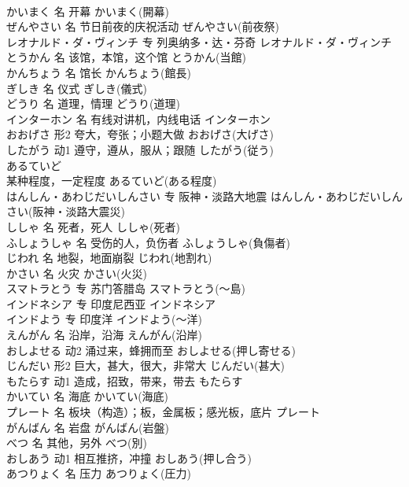 \documentclass[8pt]{extreport}
\begin{document}
\begin{CJK}{UTF8}{min}
\\	かいまく	名	开幕	かいまく(開幕)	
\\	ぜんやさい	名	节日前夜的庆祝活动	ぜんやさい(前夜祭)	
\\	レオナルド・ダ・ヴィンチ	专	列奥纳多・达・芬奇	レオナルド・ダ・ヴィンチ	
\\	とうかん	名	该馆，本馆，这个馆	とうかん(当館)	
\\	かんちょう	名	馆长	かんちょう(館長)	
\\	ぎしき	名	仪式	ぎしき(儀式)	
\\	どうり	名	道理，情理	どうり(道理)	
\\	インターホン	名	有线对讲机，内线电话	インターホン	
\\	おおげさ	形2	夸大，夸张；小题大做	おおげさ(大げさ)	
\\	したがう	动1	遵守，遵从，服从；跟随	したがう(従う)	
\\	あるていど	
\\	某种程度，一定程度	あるていど(ある程度)	
\\	はんしん・あわじだいしんさい	专	阪神・淡路大地震	はんしん・あわじだいしんさい(阪神・淡路大震災)	
\\	ししゃ	名	死者，死人	ししゃ(死者)	
\\	ふしょうしゃ	名	受伤的人，负伤者	ふしょうしゃ(負傷者)	
\\	じわれ	名	地裂，地面崩裂	じわれ(地割れ)	
\\	かさい	名	火灾	かさい(火災)	
\\	スマトラとう	专	苏门答腊岛	スマトラとう(～島)	
\\	インドネシア	专	印度尼西亚	インドネシア	
\\	インドよう	专	印度洋	インドよう(～洋)	
\\	えんがん	名	沿岸，沿海	えんがん(沿岸)	
\\	おしよせる	动2	涌过来，蜂拥而至	おしよせる(押し寄せる)	
\\	じんだい	形2	巨大，甚大，很大，非常大	じんだい(甚大)	
\\	もたらす	动1	造成，招致，带来，带去	もたらす	
\\	かいてい	名	海底	かいてい(海底)	
\\	プレート	名	板块（构造）；板，金属板；感光板，底片	プレート	
\\	がんばん	名	岩盘	がんばん(岩盤)	
\\	べつ	名	其他，另外	べつ(別)	
\\	おしあう	动1	相互推挤，冲撞	おしあう(押し合う)	
\\	あつりょく	名	压力	あつりょく(圧力)	

\end{CJK}
\end{document}
